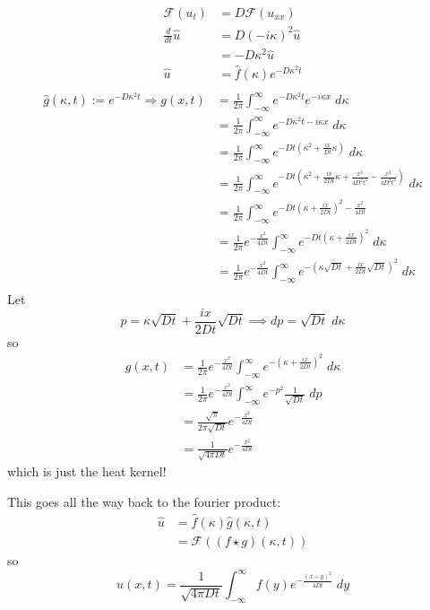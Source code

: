 \documentclass[12pt]{article}
\renewcommand{\hat}[1]{\widehat{#1}}
\newcommand{\F}[1]{\mathcal{F}(#1)}
\begin{document}
\color{blue}
\begin{align*}
    \F{u_t} &= D\F{u_{xx}}\\
    \frac{d}{dt} \hat{u} &= D(-i\kappa)^2 \hat{u}\\
    &= -D\kappa^2 \hat{u}\\
    \hat{u} &= \hat{f}(\kappa)e^{-D\kappa^2 t}\\
\end{align*}
\begin{align*}
    \hat{g}(\kappa, t) := e^{-D\kappa^2 t} \Longrightarrow g(x, t) &= \frac{1}{2\pi} \int_{-\infty}^{\infty} e^{-D\kappa^2 t} e^{-i\kappa x}\; d\kappa\\
    &=  \frac{1}{2\pi} \int_{-\infty}^{\infty} e^{-D\kappa^2 t -i\kappa x}\; d\kappa\\
    &= \frac{1}{2\pi} \int_{-\infty}^{\infty} e^{-Dt(\kappa^2  + \frac{ix}{Dt}\kappa)}\; d\kappa\\
    &= \frac{1}{2\pi} \int_{-\infty}^{\infty} e^{-Dt(\kappa^2 + \frac{ix}{2Dt}\kappa + \frac{x^2}{4D^2t^2} - \frac{x^2}{4D^2t^2})}\; d\kappa\\
    &=  \frac{1}{2\pi} \int_{-\infty}^{\infty} e^{-Dt(\kappa + \frac{ix}{2Dt})^2 - \frac{x^2}{4Dt}}\\
    &= \frac{1}{2\pi}e^{- \frac{x^2}{4Dt}} \int_{-\infty}^{\infty} e^{-Dt(\kappa + \frac{ix}{2Dt})^2}\; d\kappa\\
    &= \frac{1}{2\pi}e^{- \frac{x^2}{4Dt}} \int_{-\infty}^{\infty} e^{-(\kappa\sqrt{Dt} + \frac{ix}{2Dt}\sqrt{Dt})^2}\; d\kappa\\
\end{align*}
Let 
\[p =\kappa\sqrt{Dt} + \frac{ix}{2Dt}\sqrt{Dt} \implies dp = \sqrt{Dt}\; d\kappa\]
so 
\begin{align*}
    g(x, t) &= \frac{1}{2\pi}e^{- \frac{x^2}{4Dt}} \int_{-\infty}^{\infty} e^{-(\kappa + \frac{ix}{2Dt})^2}\; d\kappa\\
    &= \frac{1}{2\pi}e^{- \frac{x^2}{4Dt}} \int_{-\infty}^{\infty} e^{-p^2} \frac{1}{\sqrt{Dt}}\; dp\\
    &=  \frac{\sqrt{\pi}}{2\pi\sqrt{Dt}} e^{- \frac{x^2}{4Dt}}\\
    &= \frac{1}{\sqrt{4\pi Dt}}e^{- \frac{x^2}{4Dt}}
\end{align*}
which is just the heat kernel!

This goes all the way back to the fourier product:
\begin{align*}
    \hat{u} &= \hat{f}(\kappa) \hat{g}(\kappa, t)\\
    &= \F{(f \star g)(\kappa, t)}
\end{align*}
so 
\[\boxed{u(x, t) = \frac{1}{\sqrt{4\pi Dt}}\int_{-\infty}^\infty f(y) e^{-\frac{(x - y)^2}{4Dt}}\; dy}\]
\color{black}
\pagebreak
\end{document}
